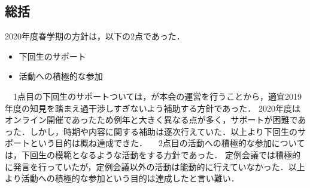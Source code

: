 \subsection*{\thirdGrade{}総括}


2020年度春学期の\thirdGrade{}方針は，以下の2点であった．
\begin{itemize}
  \item 下回生のサポート
  \item 活動への積極的な参加
\end{itemize}
　1点目の下回生のサポートついては，\secondGrade{}が本会の運営を行うことから，適宜2019年度の知見を踏まえ過干渉しすぎないよう補助する方針であった．
2020年度はオンライン開催であったため例年と大きく異なる点が多く，サポートが困難であった．しかし，時期や内容に関する補助は逐次行えていた．以上より下回生のサポートという目的は概ね達成できた．
　2点目の活動への積極的な参加については，下回生の模範となるような活動をする方針であった．
定例会議では積極的に発言を行っていたが，定例会議以外の活動は能動的に行えていなかった．以上より活動への積極的な参加という目的は達成したと言い難い．


